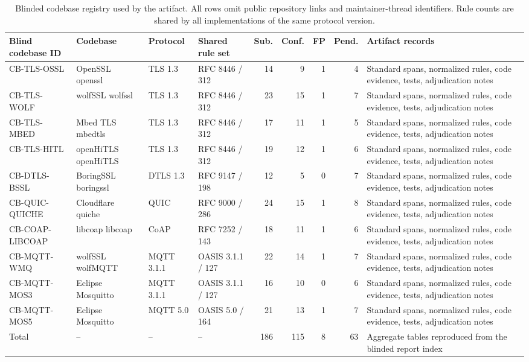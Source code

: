 \begin{table}[t]
\centering
\caption{Blinded codebase registry used by the artifact. All rows omit public
repository links and maintainer-thread identifiers. Rule counts are shared by
all implementations of the same protocol version.}
\label{tab:codebase-registry}
\small
\renewcommand{\arraystretch}{1.08}
\setlength{\tabcolsep}{3.2pt}
\begin{tabular}{p{}p{}p{}p{}rrrrp{}}
\toprule
\textbf{Blind codebase ID}
& \textbf{Codebase}
& \textbf{Protocol}
& \textbf{Shared rule set}
& \textbf{Sub.}
& \textbf{Conf.}
& \textbf{FP}
& \textbf{Pend.}
& \textbf{Artifact records} \\
\midrule
CB-TLS-OSSL & OpenSSL openssl & TLS 1.3 & RFC 8446 / 312 & 14 & 9 & 1 & 4 & Standard spans, normalized rules, code evidence, tests, adjudication notes \\
CB-TLS-WOLF & wolfSSL wolfssl & TLS 1.3 & RFC 8446 / 312 & 23 & 15 & 1 & 7 & Standard spans, normalized rules, code evidence, tests, adjudication notes \\
CB-TLS-MBED & Mbed TLS mbedtls & TLS 1.3 & RFC 8446 / 312 & 17 & 11 & 1 & 5 & Standard spans, normalized rules, code evidence, tests, adjudication notes \\
CB-TLS-HITL & openHiTLS openHiTLS & TLS 1.3 & RFC 8446 / 312 & 19 & 12 & 1 & 6 & Standard spans, normalized rules, code evidence, tests, adjudication notes \\
CB-DTLS-BSSL & BoringSSL boringssl & DTLS 1.3 & RFC 9147 / 198 & 12 & 5 & 0 & 7 & Standard spans, normalized rules, code evidence, tests, adjudication notes \\
CB-QUIC-QUICHE & Cloudflare quiche & QUIC & RFC 9000 / 286 & 24 & 15 & 1 & 8 & Standard spans, normalized rules, code evidence, tests, adjudication notes \\
CB-COAP-LIBCOAP & libcoap libcoap & CoAP & RFC 7252 / 143 & 18 & 11 & 1 & 6 & Standard spans, normalized rules, code evidence, tests, adjudication notes \\
CB-MQTT-WMQ & wolfSSL wolfMQTT & MQTT 3.1.1 & OASIS 3.1.1 / 127 & 22 & 14 & 1 & 7 & Standard spans, normalized rules, code evidence, tests, adjudication notes \\
CB-MQTT-MOS3 & Eclipse Mosquitto & MQTT 3.1.1 & OASIS 3.1.1 / 127 & 16 & 10 & 0 & 6 & Standard spans, normalized rules, code evidence, tests, adjudication notes \\
CB-MQTT-MOS5 & Eclipse Mosquitto & MQTT 5.0 & OASIS 5.0 / 164 & 21 & 13 & 1 & 7 & Standard spans, normalized rules, code evidence, tests, adjudication notes \\
\midrule
Total & -- & -- & -- & 186 & 115 & 8 & 63 & Aggregate tables reproduced from the blinded report index \\
\bottomrule
\end{tabular}
\end{table}

